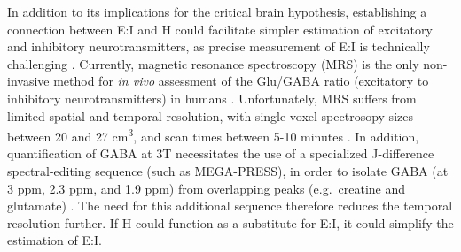 \documentclass[
true
]{sn-jnl}
\begin{document}
In addition to its implications for the critical brain hypothesis,
establishing a connection between E:I and H could facilitate simpler
estimation of excitatory and inhibitory neurotransmitters, as precise
measurement of E:I is technically challenging
\citep{ajramContribution1HMagnetic2019}. Currently, magnetic resonance
spectroscopy (MRS) is the only non-invasive method for \emph{in vivo}
assessment of the Glu/GABA ratio (excitatory to inhibitory
neurotransmitters) in humans
\citep{stanleyFunctionalMagneticResonance2018, harrisEdited1Magnetic2017}.
Unfortunately, MRS suffers from limited spatial and temporal resolution,
with single-voxel spectrosopy sizes between 20 and 27
cm\textsuperscript{3}, and scan times between 5-10 minutes
\citep{gaoInferringSynapticExcitation2017, ajramContribution1HMagnetic2019, stanleyFunctionalMagneticResonance2018}.
In addition, quantification of GABA at 3T necessitates the use of a
specialized J-difference spectral-editing sequence (such as MEGA-PRESS),
in order to isolate GABA (at 3 ppm, 2.3 ppm, and 1.9 ppm) from
overlapping peaks (e.g.~creatine and glutamate)
\citep{peekComprehensiveGuideMEGAPRESS2023}. The need for this
additional sequence therefore reduces the temporal resolution further.
If H could function as a substitute for E:I, it could simplify the
estimation of E:I.
\end{document}
